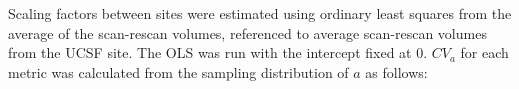 Scaling factors between sites were estimated using ordinary least squares from the average of the scan-rescan volumes, referenced to average scan-rescan volumes from the UCSF site. The OLS was run with the intercept fixed at 0. $CV_a$ for each metric was calculated from the sampling distribution of $\hat{a}$ as follows: %